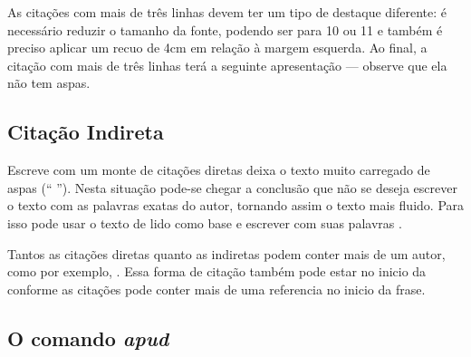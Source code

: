 \begin{quoting}[rightmargin=0cm,leftmargin=4cm] %
\begin{singlespace} %
{
\footnotesize %
As citações com mais de três linhas devem ter um tipo de destaque diferente: é necessário reduzir o tamanho da fonte, podendo ser para 10 ou 11 e também é preciso aplicar um recuo de 4cm em relação à margem esquerda. Ao final, a citação com mais de três linhas terá a seguinte apresentação — observe que ela não tem aspas.
}
\end{singlespace} %
\end{quoting} %


\subsection{Citação Indireta}

Escreve com um monte de citações diretas deixa o texto muito carregado de aspas (``  ''). Nesta situação pode-se chegar a conclusão que não se deseja escrever o texto com as palavras exatas do autor, tornando assim o texto mais fluido. Para isso pode usar o texto de lido como base e escrever com suas palavras \cite{xavier2020}.


Tantos as citações diretas quanto as indiretas podem conter mais de um autor, como por exemplo, \cite{xavier2020, da2005}. Essa forma de citação também pode estar no inicio da conforme \textcite{xavier2020, da2005} as citações pode conter mais de uma referencia no inicio da frase. 



 \subsection{O comando \textit{apud}}

 

